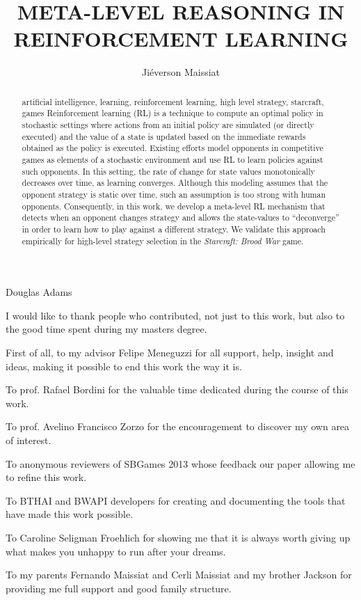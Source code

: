 \documentclass[english,twoside]{pucrs-ppgcc}
\author{Jiéverson Maissiat}
\title{META-LEVEL REASONING IN REINFORCEMENT LEARNING}
      {META-LEVEL REASONING IN REINFORCEMENT LEARNING}
\begin{document}
 


 {Douglas Adams}

\begin{agradecimentos}

I would like to thank people who contributed, not just to this work, but also to the good time spent during my masters degree.

First of all, to my advisor Felipe Meneguzzi for all support, help, insight and ideas, making it possible to end this work the way it is.

To prof. Rafael Bordini for the valuable time dedicated during the course of this work.

To prof. Avelino Francisco Zorzo for the encouragement to discover my own area of interest.

To anonymous reviewers of SBGames 2013 whose feedback our paper allowing me to refine this work. 

To BTHAI and BWAPI developers for creating and documenting the tools that have made this work possible.

To Caroline Seligman Froehlich for showing me that it is always worth giving up what makes you unhappy to run after your dreams.

To my parents Fernando Maissiat and Cerli Maissiat and my brother Jackson for providing me full support and good family structure.

\end{agradecimentos}

\begin{abstract}{artificial intelligence, learning, reinforcement learning, high level strategy, starcraft, games}
Reinforcement learning (RL) is a technique to compute an optimal policy in stochastic settings where actions from an initial policy are simulated (or directly executed) and the value of a state is updated based on the immediate rewards obtained as the policy is executed. 
Existing efforts model opponents in competitive games as elements of a stochastic environment and use RL to learn policies against such opponents. 
In this setting, the rate of change for state values monotonically decreases over time, as learning converges. 
Although this modeling assumes that the opponent strategy is static over time, such an assumption is too strong with human opponents. 
Consequently, in this work, we develop a meta-level RL mechanism that detects when an opponent changes strategy and allows the state-values to ``deconverge'' in order to learn how to play against a different strategy. 
We validate this approach empirically for high-level strategy selection in the \textit{Starcraft: Brood War} game.
\end{abstract}
\end{document}
